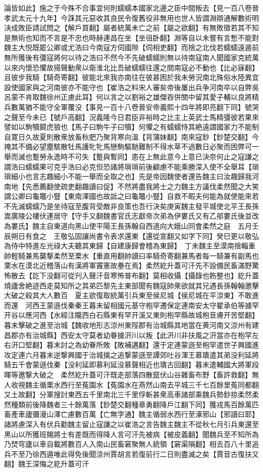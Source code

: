論皆如此】施之于今殊不合事宜何則蠕蠕本國家北邊之臣中間叛去【見一百八卷晉孝武太元十九年】今誅其元惡收其良民令復舊役非無用也世人皆謂淵辯通解數術明決成敗臣請試問之【解戶買翻】屬者統萬未亡之前【屬之欲翻】有無敗徵若其不知是無術也知而不言是不忠也時赫連昌在坐【坐徂卧翻】淵等自以未嘗有言慙不能對魏主大悦既罷公卿或尤浩曰今南寇方伺國隙【伺相吏翻】而捨之北伐若蠕蠕遠遁前無所獲後有彊寇將何以待之浩曰不然今不先破蠕蠕則無以待南寇南人聞國家克統萬以來内懷恐懼故揚聲動衆以衛淮北比吾破蠕蠕往還之間南寇必不動也【比必寐翻】且彼步我騎【騎奇寄翻】彼能北來我亦南往在彼甚困於我未勞況南北殊俗水陸異宜設使國家與之河南彼亦不能守也【崔浩之料宋人審矣帝後屢出兵争河南卒以自弊吳呂蒙不肯取魏徐州正慮此耳】何以言之以劉裕之雄傑吞併關中留其愛子輔以良將精兵數萬猶不能守全軍覆没【事見一百十八卷晉安帝義熙十四年將即亮翻下同】號哭之聲至今未已【號戶高翻】況義隆今日君臣非裕時之比主上英武士馬精彊彼若果來譬如以駒犢鬬虎狼也【馬子曰駒牛子曰犢】何懼之有蠕蠕恃其絶遠謂國家力不能制自寛日久故夏則散衆放畜秋肥乃聚背寒向溫【背蒲妹翻】南來寇鈔【鈔楚交翻】今掩其不備必望塵駭散牡馬護牝牝馬戀駒驅馳難制不得水草不過數日必聚而困弊可一舉而滅也蹔勞永逸時不可失【蹔與暫同】患在上無此意今上意已決奈何止之寇謙之謂浩曰蠕蠕果可克乎浩曰必克但恐諸將瑣瑣前後顧慮不能乘勝深入使不全舉耳【瑣瑣細小也言志趣細小不能一舉而全取之也】先是帝因魏使者還告魏主曰汝趣歸我河南地【先悉薦翻使疏吏翻趣讀曰促】不然將盡我將士之力魏主方議伐柔然聞之大笑謂公卿曰龜鼈小豎【東南澤國也故詆之曰龜鼈小豎】自救不暇夫何能為就使能來若不先滅蠕蠕乃是坐待寇至腹背受敵非良策也吾行決矣庚寅魏主發平城使北平王長孫嵩廣陵公樓伏連居守【守手又翻魏書官氏志獻帝次弟為伊婁氏又有乙郍婁氏後並改為婁氏】魏主自東道向黑山使平陽王長孫翰自西道向大娥山同會柔然之庭　五月壬辰朔日有食之　王敬弘固讓尚書令表求還東【還從宣翻又如字下同】癸巳更以敬弘為侍中特進左光祿大夫聽其東歸【自建康歸會稽為東歸】　丁未魏主至漠南捨輜重帥輕騎兼馬襲撃柔然至栗水【重直用翻帥讀曰率騎奇寄翻兼馬者每一騎兼有副馬也栗水在漠北近稽落山有漢將軍竇憲故壘在焉】柔然紇升蓋可汗先不設備民畜滿野驚怖散去【訖下没翻可從刋入聲汗音寒怖普布翻】莫相收攝【攝錄也飭整也】紇升蓋燒廬舍絶迹西走莫知所之其弟匹黎先主東部聞有魏寇帥衆欲就其兄遇長孫翰翰邀擊大破之殺其大人數百　夏主欲復取統萬引兵東至侯尼城【侯尼城在平涼東】不敢進而還　河西王蒙遜伐秦秦王暮末留相國元基守枹罕遷保定連南安太守翟承伯等據罕开谷以應河西【水經注隴西白石縣東有罕开溪又東則枹罕縣故城枹音膚开苦堅翻】暮末擊破之進至治城【魏收地形志涼州東陘郡有治城縣其地當在黄河南又涼州有建昌郡亦有治城縣】西安太守莫者幼眷據汧川以叛【此汧川非扶風之汧當亦在枹罕左右汧口堅翻】暮末討之為幼眷所敗【敗補邁翻】還于定連蒙遜至枹罕遣世子興國進攻定連六月暮末逆撃興國于治城擒之追撃蒙遜至譚郊吐谷渾王慕璝遣其弟没利延將騎五千會蒙遜伐秦【没利延即慕利延没慕聲相近也璝古回翻】暮末遣輔國大將軍段暉等邀撃大破之　柔然紇升蓋可汗既走部落四散竄伏山谷雜畜布野【畜許救翻】無人收視魏主循栗水西行至菟園水【菟園水在燕然山南去平城三千七百餘里菟同都翻又土故翻】分軍搜討東西五千里南北三千里俘斬甚衆高車諸部乘魏兵勢鈔掠柔然柔然種類前後降魏者三十餘萬落【鈔楚交翻種章勇翻降戶江翻下同】獲戎馬百餘萬匹畜產車廬彌漫山澤亡慮數百萬【亡無字通】魏主循弱水西行至涿邪山【邪讀曰耶】諸將慮深入有伏兵勸魏主留止寇謙之以崔浩之言告魏主魏主不從秋七月引兵東還至黑山以所獲班賜將士有差既而得降人言可汗先被病【被皮義翻】聞魏兵至不知所為乃焚穹廬以車自載將數百人入南山民畜窘聚無人統領【窘渠隕翻】相去百八十里追兵不至乃徐西遁唯此得免後聞涼州賈胡言若復前行二日則盡滅之矣【賈音古復扶又翻】魏王深悔之紇升蓋可汗